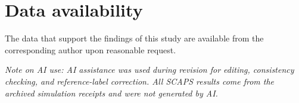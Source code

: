 \documentclass[11pt,a4paper]{article}
\begin{document}
\section*{Data availability}

The data that support the findings of this study are available from the corresponding author upon reasonable request.

\textit{Note on AI use: AI assistance was used during revision for editing, consistency checking, and reference-label correction. All SCAPS results come from the archived simulation receipts and were not generated by AI.}



\end{document}
